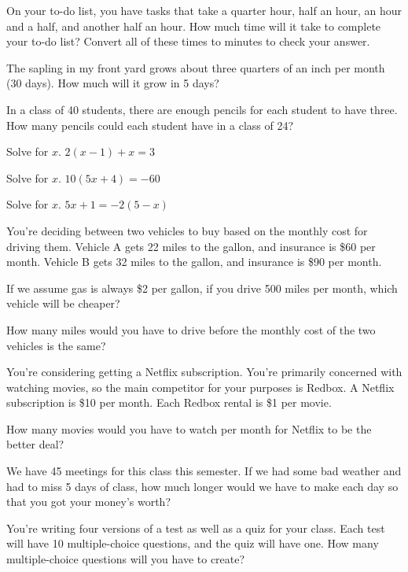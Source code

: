 \bigskip
\begin{exercise}
On your to-do list, you have tasks that take a quarter hour, half an hour, an hour and a half, and another half an hour.  How much time will it take to complete your to-do list?  Convert all of these times to minutes to check your answer.
\end{exercise}
\bigskip
\begin{exercise}
The sapling in my front yard grows about three quarters of an inch per month (30 days).  How much will it grow in 5 days?
\end{exercise}
\bigskip
\begin{exercise}
In a class of 40 students, there are enough pencils for each student to have three.  How many pencils could each student have in a class of 24?
\end{exercise}
\bigskip
\begin{exercise}
Solve for $x$.
$2(x-1)+x = 3$
\end{exercise}
\bigskip
\begin{exercise}
Solve for $x$.
$10(5x+4) = -60$
\end{exercise}
\bigskip
\begin{exercise}
Solve for $x$.
$5x + 1 = -2(5-x)$
\end{exercise}
\bigskip

\begin{exercise}
You're deciding between two vehicles to buy based on the monthly cost for driving them.  Vehicle A gets 22 miles to the gallon, and insurance is \$60 per month.  Vehicle B gets 32 miles to the gallon, and insurance is \$90 per month.

If we assume gas is always \$2 per gallon, if you drive 500 miles per month, which vehicle will be cheaper?

How many miles would you have to drive before the monthly cost of the two vehicles is the same?
\end{exercise}
\bigskip

\begin{exercise}
You're considering getting a Netflix subscription.  You're primarily concerned with watching movies, so the main competitor for your purposes is Redbox.  A Netflix subscription is \$10 per month.  Each Redbox rental is \$1 per movie.

How many movies would you have to watch per month for Netflix to be the better deal?
\end{exercise}
\bigskip

\begin{exercise}
We have 45 meetings for this class this semester.  If we had some bad weather and had to miss 5 days of class, how much longer would we have to make each day so that you got your money's worth?
\end{exercise}
\bigskip

\begin{exercise}
You're writing four versions of a test as well as a quiz for your class.  Each test will have 10 multiple-choice questions, and the quiz will have one.  How many multiple-choice questions will you have to create?
\end{exercise}
\bigskip